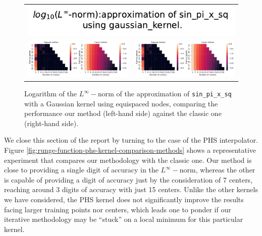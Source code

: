 \documentclass[12pt]{report} %
\begin{document}
\begin{figure}[h]
  \begin{tabular}{cc}
    \multicolumn{2}{c}{{\includegraphics[width=.5\textwidth]
    {imagenes/experiments/1d/variational/linf_sin_pi_x_sq_gaussian_kernel_Methods_Title.pdf}}}                                                                                       \\
    {\includegraphics[height=.4\textwidth, trim={0 0 11.5cm 0},clip=true]
    {imagenes/experiments/1d/variational/linf_sin_pi_x_sq_gaussian_kernel_Methods_Comparison.pdf}}  &
     {\includegraphics[height=.4\textwidth, trim={9.5cm 0 0 0},clip=true]{imagenes/experiments/1d/variational/linf_sin_pi_x_sq_gaussian_kernel_Methods_Comparison.pdf}} \\
  \end{tabular}
  \caption{Logarithm of the $L^\infty-$norm of the approximation of \texttt{sin\_pi\_x\_sq} with a Gaussian kernel using equispaced nodes, comparing the performance our method (left-hand side) against the classic one (right-hand side).}
  \label{fig:sin-pi-x-sq-gaussian-kernel-comparison-methods}
\end{figure}


We close this section of the report by turning to the case of the PHS interpolator. Figure \ref{fig:runge-function-phs-kernel-comparison-methods} shows a representative experiment that compares our methodology with the classic one. Our method is close to providing a single digit of accuracy in the $L^\infty-$norm, whereas the other is capable of providing a digit of accuracy just by the consideration of 7 centers, reaching around 3 digits of accuracy with just 15 centers. Unlike the other kernels we have considered, the PHS kernel does not significantly improve the results facing larger training points nor centers, which leads one to ponder if our iterative methodology may be ``stuck'' on a local minimum for this particular kernel.
\end{document}
